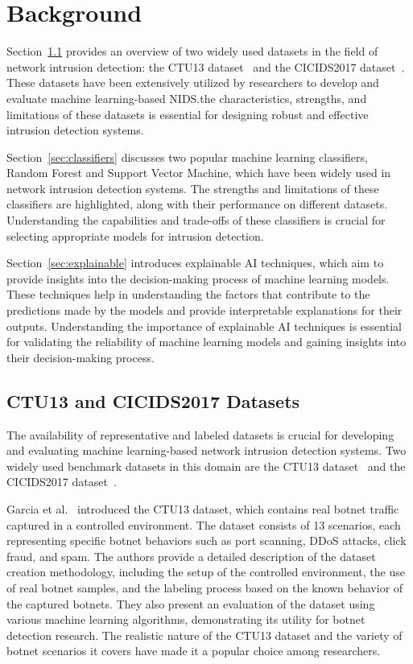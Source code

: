 \chapter{Background}

Section~\ref{sec:datasets} provides an overview of two widely used datasets in the field of network intrusion detection: the CTU13 dataset~\cite{garcia2014empirical} and the CICIDS2017 dataset~\cite{sharafaldin2018toward}. These datasets have been extensively utilized by researchers to develop and evaluate machine learning-based NIDS.\@Understanding the characteristics, strengths, and limitations of these datasets is essential for designing robust and effective intrusion detection systems.

Section~\ref{sec:classifiers} discusses two popular machine learning classifiers, Random Forest and Support Vector Machine, which have been widely used in network intrusion detection systems. The strengths and limitations of these classifiers are highlighted, along with their performance on different datasets. Understanding the capabilities and trade-offs of these classifiers is crucial for selecting appropriate models for intrusion detection.

Section~\ref{sec:explainable} introduces explainable AI techniques, which aim to provide insights into the decision-making process of machine learning models. These techniques help in understanding the factors that contribute to the predictions made by the models and provide interpretable explanations for their outputs. Understanding the importance of explainable AI techniques is essential for validating the reliability of machine learning models and gaining insights into their decision-making process.

\section{CTU13 and CICIDS2017 Datasets}\label{sec:datasets}

The availability of representative and labeled datasets is crucial for developing and evaluating machine learning-based network intrusion detection systems. Two widely used benchmark datasets in this domain are the CTU13 dataset~\cite{garcia2014empirical} and the CICIDS2017 dataset~\cite{sharafaldin2018toward}.

Garcia et al.~\cite{garcia2014empirical} introduced the CTU13 dataset, which contains real botnet traffic captured in a controlled environment. The dataset consists of 13 scenarios, each representing specific botnet behaviors such as port scanning, DDoS attacks, click fraud, and spam. The authors provide a detailed description of the dataset creation methodology, including the setup of the controlled environment, the use of real botnet samples, and the labeling process based on the known behavior of the captured botnets. They also present an evaluation of the dataset using various machine learning algorithms, demonstrating its utility for botnet detection research. The realistic nature of the CTU13 dataset and the variety of botnet scenarios it covers have made it a popular choice among researchers.

